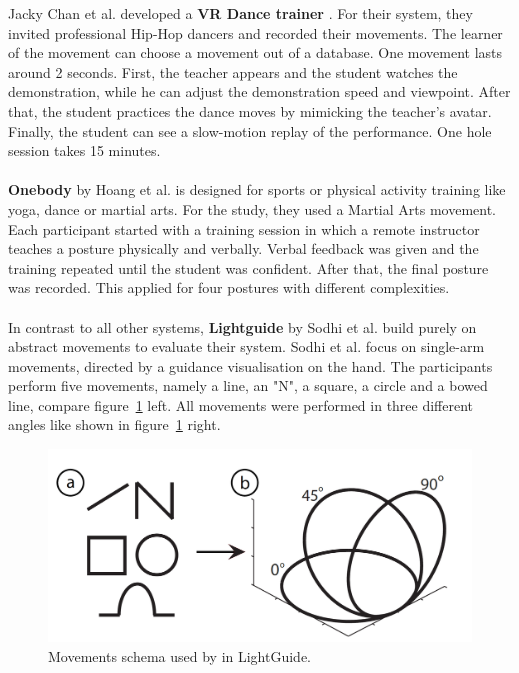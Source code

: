 Jacky Chan et al. developed a \textbf{VR Dance trainer} \cite{Chan2010}. For their system, they invited professional Hip-Hop dancers and recorded their movements. The learner of the movement can choose a movement out of a database. One movement lasts around 2 seconds. First, the teacher appears and the student watches the demonstration, while he can adjust the demonstration speed and viewpoint. After that, the student practices the dance moves by mimicking the teacher's avatar. Finally, the student can see a slow-motion replay of the performance. One hole session takes 15 minutes.\\ \\
\textbf{Onebody} by Hoang et al. \cite{Hoang2016} is designed for sports or physical activity training like yoga, dance or martial arts. For the study, they used a Martial Arts movement. Each participant started with a training session in which a remote instructor teaches a posture physically and verbally. Verbal feedback was given and the training repeated until the student was confident. After that, the final posture was recorded. This applied for four postures with different complexities.\\ \\
In contrast to all other systems, \textbf{Lightguide} by Sodhi et al. \cite{Sodhi2012} build purely on abstract movements to evaluate their system. Sodhi et al. focus on single-arm movements, directed by a guidance visualisation on the hand. The participants perform five movements, namely a line, an "N", a square, a circle and a bowed line, compare figure~\ref{fig:lightguide1} left. All movements were performed in three different angles like shown in figure~\ref{fig:lightguide1} right.
\begin{figure}
	\centering
	\includegraphics[width=1.0\textwidth]{img/lightguide_movements.PNG}
	\caption{Movements schema used by \cite{Sodhi2012} in LightGuide.}
	\label{fig:lightguide1}
\end{figure}\\
